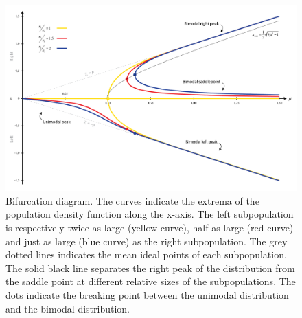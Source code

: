 \documentclass[preprint, 12pt]{elsarticle}
\begin{document}
\begin{figure}[ht!]
	\centering
	\includegraphics[width=\textwidth]{Graphics/Bifurcation.pdf}
	\caption{Bifurcation diagram. The curves indicate the extrema of the population density function along the x-axis. The left subpopulation is respectively twice as large (yellow curve), half as large (red curve) and just as large (blue curve) as the right subpopulation. The grey dotted lines indicates the mean ideal points of each subpopulation. The solid black line separates the right peak of the distribution from the saddle point at different relative sizes of the subpopulations. The dots indicate the breaking point between the unimodal distribution and the bimodal distribution.}
	\label{fig:bifurcation}
\end{figure}
\end{document}
